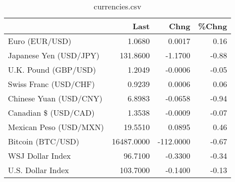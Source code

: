 \documentclass{article}%
\begin{document}
%


\begin{table}[htbp]%
\caption{currencies.csv}%
\centering%
\begin{adjustbox}{width=1\textwidth}%
\begin{tabular}{lrrr}
\toprule
                       &       Last &      Chng &  \%Chng \\
\midrule
        Euro (EUR/USD) &     1.0680 &    0.0017 &   0.16 \\
Japanese Yen (USD/JPY) &   131.8600 &   -1.1700 &  -0.88 \\
  U.K. Pound (GBP/USD) &     1.2049 &   -0.0006 &  -0.05 \\
 Swiss Franc (USD/CHF) &     0.9239 &    0.0006 &   0.06 \\
Chinese Yuan (USD/CNY) &     6.8983 &   -0.0658 &  -0.94 \\
  Canadian \$ (USD/CAD) &     1.3538 &   -0.0009 &  -0.07 \\
Mexican Peso (USD/MXN) &    19.5510 &    0.0895 &   0.46 \\
     Bitcoin (BTC/USD) & 16487.0000 & -112.0000 &  -0.67 \\
      WSJ Dollar Index &    96.7100 &   -0.3300 &  -0.34 \\
     U.S. Dollar Index &   103.7000 &   -0.1400 &  -0.13 \\
\bottomrule
\end{tabular}
%
\end{adjustbox}%
\end{table}

%
\end{document}
